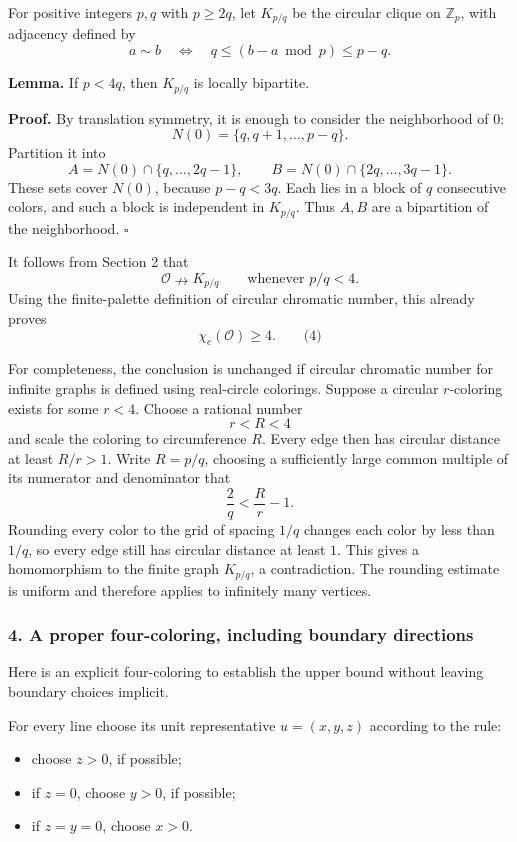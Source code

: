 \documentclass[
  11pt,
  a4paper,
]{article}
\providecommand{\tightlist}{%
  \setlength{\itemsep}{0pt}\setlength{\parskip}{0pt}}
\begin{document}
For positive integers \(p,q\) with \(p\ge2q\), let \(K_{p/q}\) be the
circular clique on \(\mathbb Z_p\), with adjacency defined by \[
a\sim b
\quad\Longleftrightarrow\quad
q\le (b-a\bmod p)\le p-q.
\]

\textbf{Lemma.} If \(p<4q\), then \(K_{p/q}\) is locally bipartite.

\textbf{Proof.} By translation symmetry, it is enough to consider the
neighborhood of \(0\): \[
N(0)=\{q,q+1,\ldots,p-q\}.
\] Partition it into \[
A=N(0)\cap\{q,\ldots,2q-1\},
\qquad
B=N(0)\cap\{2q,\ldots,3q-1\}.
\] These sets cover \(N(0)\), because \(p-q<3q\). Each lies in a block
of \(q\) consecutive colors, and such a block is independent in
\(K_{p/q}\). Thus \(A,B\) are a bipartition of the neighborhood.
\(\square\)

It follows from Section 2 that \[
\mathcal O\nrightarrow K_{p/q}
\qquad\text{whenever }p/q<4.
\] Using the finite-palette definition of circular chromatic number,
this already proves \[
\chi_c(\mathcal O)\ge4. \qquad\text{(4)}
\]

For completeness, the conclusion is unchanged if circular chromatic
number for infinite graphs is defined using real-circle colorings.
Suppose a circular \(r\)-coloring exists for some \(r<4\). Choose a
rational number \[
r<R<4
\] and scale the coloring to circumference \(R\). Every edge then has
circular distance at least \(R/r>1\). Write \(R=p/q\), choosing a
sufficiently large common multiple of its numerator and denominator that
\[
\frac{2}{q}<\frac Rr-1.
\] Rounding every color to the grid of spacing \(1/q\) changes each
color by less than \(1/q\), so every edge still has circular distance at
least \(1\). This gives a homomorphism to the finite graph \(K_{p/q}\),
a contradiction. The rounding estimate is uniform and therefore applies
to infinitely many vertices.

\subsubsection{4. A proper four-coloring, including boundary
directions}\label{a-proper-four-coloring-including-boundary-directions}

Here is an explicit four-coloring to establish the upper bound without
leaving boundary choices implicit.

For every line choose its unit representative \(u=(x,y,z)\) according to
the rule:

\begin{itemize}
\tightlist
\item
  choose \(z>0\), if possible;
\item
  if \(z=0\), choose \(y>0\), if possible;
\item
  if \(z=y=0\), choose \(x>0\).
\end{itemize}
\end{document}
